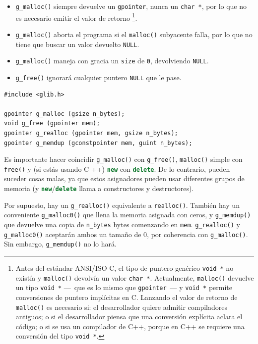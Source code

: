\begin{itemize}
    \item \lstinline{g_malloc()} siempre devuelve un \lstinline{gpointer}, nunca un \lstinline{char *}, por lo que no es necesario emitir el valor de retorno \footnote{Antes del estándar ANSI/ISO C, el tipo de puntero genérico \lstinline{void *} no existía y \lstinline{malloc()} devolvía un valor \lstinline{char *}. Actualmente, \lstinline{malloc()} devuelve un tipo \lstinline{void *} ---~que es lo mismo que \lstinline{gpointer}~--- y \lstinline{void *} permite conversiones de puntero implícitas en C. Lanzando el valor de retorno de \lstinline{malloc()} es necesario si: el desarrollador quiere admitir compiladores antiguos; o si el desarrollador piensa que una conversión explícita aclara el código; o si se usa un compilador de C++, porque en C++ se requiere una conversión del tipo \lstinline{void *}.}.
    
    \item \lstinline{g_malloc()} aborta el programa si el \lstinline{malloc()} subyacente falla, por lo que no tiene que buscar un valor devuelto \lstinline{NULL}.
    
    \item \lstinline{g_malloc()} maneja con gracia un \lstinline{size} de \lstinline{0}, devolviendo \lstinline{NULL}.
    
    \item \lstinline{g_free()} ignorará cualquier puntero \lstinline{NULL} que le pase.
\end{itemize}

\begin{lstlisting}[float, caption={Asignación de memoria GLib}, label=glib-malloc-free]
#include <glib.h>

gpointer g_malloc (gsize n_bytes);
void g_free (gpointer mem);
gpointer g_realloc (gpointer mem, gsize n_bytes);
gpointer g_memdup (gconstpointer mem, guint n_bytes);
\end{lstlisting}

Es importante hacer coincidir \lstinline{g_malloc()} con \lstinline{g_free()}, \lstinline{malloc()} simple con \lstinline{free()} y (si estás usando C ++) \lstinline[language=C++]{new} con \lstinline[language=C++]{delete}. De lo contrario, pueden suceder cosas malas, ya que estos asignadores pueden usar diferentes grupos de memoria (y \lstinline[language=C++]{new}/\lstinline[language=C++]{delete} llama a constructores y destructores).

Por supuesto, hay un \lstinline{g_realloc()} equivalente a \lstinline{realloc()}. También hay un conveniente \lstinline{g_malloc0()} que llena la memoria asignada con ceros, y \lstinline{g_memdup()} que devuelve una copia de \lstinline{n_bytes} bytes comenzando en \lstinline{mem}. \lstinline{g_realloc()} y \lstinline{g_malloc0()} aceptarán ambos un tamaño de 0, por coherencia con \lstinline{g_malloc()}. Sin embargo, \lstinline{g_memdup()} no lo hará.

